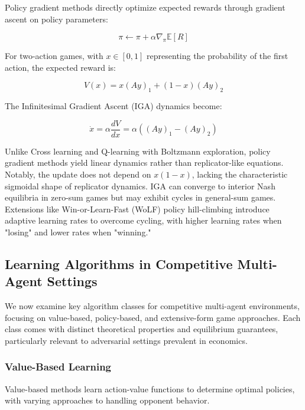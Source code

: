 Policy gradient methods directly optimize expected rewards through gradient ascent on policy parameters:

\begin{equation}
\pi \leftarrow \pi + \alpha\nabla_{\pi}\mathbb{E}[R]
\end{equation}

For two-action games, with $x \in [0,1]$ representing the probability of the first action, the expected reward is:

\begin{equation}
V(x) = x(Ay)_1 + (1-x)(Ay)_2
\end{equation}

The Infinitesimal Gradient Ascent (IGA) dynamics become:

\begin{equation}
\dot{x} = \alpha\frac{dV}{dx} = \alpha((Ay)_1 - (Ay)_2)
\end{equation}

Unlike Cross learning and Q-learning with Boltzmann exploration, policy gradient methods yield linear dynamics rather than replicator-like equations. Notably, the update does not depend on $x(1-x)$, lacking the characteristic sigmoidal shape of replicator dynamics. IGA can converge to interior Nash equilibria in zero-sum games \citep{singh2000} but may exhibit cycles in general-sum games. Extensions like Win-or-Learn-Fast (WoLF) policy hill-climbing \citep{BowlingVeloso2002} introduce adaptive learning rates to overcome cycling, with higher learning rates when "losing" and lower rates when "winning."

\subsection{Learning Algorithms in Competitive Multi-Agent Settings}

We now examine key algorithm classes for competitive multi-agent environments, focusing on value-based, policy-based, and extensive-form game approaches. Each class comes with distinct theoretical properties and equilibrium guarantees, particularly relevant to adversarial settings prevalent in economics.

\subsubsection{Value-Based Learning}

Value-based methods learn action-value functions to determine optimal policies, with varying approaches to handling opponent behavior.


